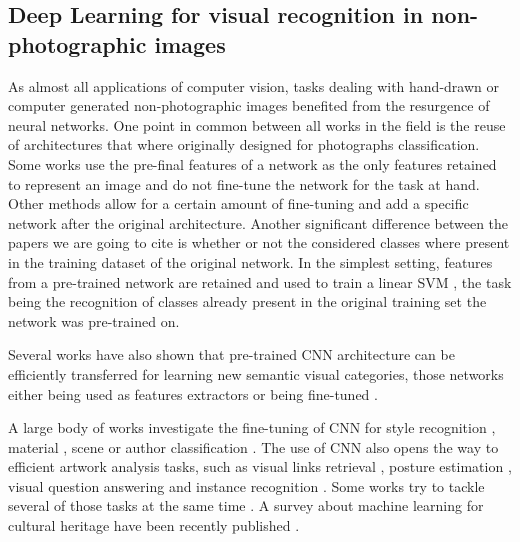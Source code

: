 \documentclass[preprint]{elsarticle}
\begin{document}
 














\subsection{Deep Learning for visual recognition in non-photographic images}

As almost all applications of computer vision, tasks dealing with hand-drawn or computer generated non-photographic images benefited from the resurgence of neural networks. One point in common between all works in the field is the reuse of architectures that where originally designed for photographs classification. Some works use the pre-final features of a network as the only features retained to represent an image and do not fine-tune the network for the task at hand. Other methods allow for a certain amount of fine-tuning and add a specific network after the original architecture.  Another significant difference between the papers we are going to cite is whether or not the considered classes where present in the training dataset of the original network. 
In the simplest setting, features from a pre-trained network are retained and used to train a linear SVM  \cite{crowley_search_2014,crowley_visual_2016}, the task being the recognition of classes already present in the original training set the network was pre-trained on. 


Several works have also shown that pre-trained CNN architecture can be efficiently transferred for learning new semantic visual categories, those networks either being used as features extractors \cite{crowley_search_2014,crowley_visual_2016} or being fine-tuned \cite{yin_object_2016,strezoski_omniart_2018,wilber_bam_2017}. 

A large body of works investigate the fine-tuning of CNN for style recognition \cite{lecoutre_recognizing_2017,mao_deepart_2017,elgammal_shape_2018}, material \cite{sabatelli_deep_2018}, scene \cite{florea_domain_2017} or author classification \cite{vannoord_learning_2017}.
The use of CNN also opens the way to efficient artwork analysis tasks, such as visual links retrieval \cite{seguin_visual_2016}, posture estimation \cite{jenicek_linking_2019}, visual question answering \cite{bongini_visual_2020} and instance recognition \cite{shen_discovering_2019,delchiaro_weblysupervised_2019}.  
Some works try to tackle several of those tasks at the same time
\cite{garcia_contextaware_2019,bianco_multitask_2019}. A survey about machine learning for cultural heritage have been recently published \cite{fiorucci_machine_2020}.
\end{document}
